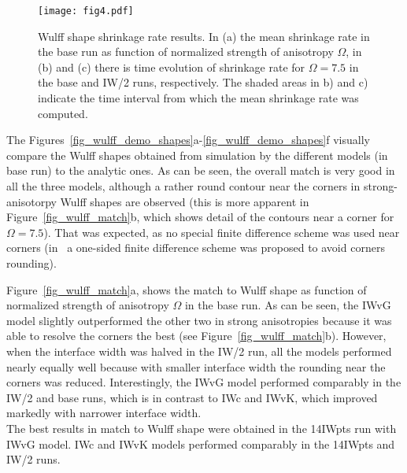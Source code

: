 \begin{figure}
	\centering
	\texttt{[image: fig4.pdf]}
	\caption[Wulff shape shrinkage rate results]{Wulff shape shrinkage rate results. In (a) the mean shrinkage rate in the base run as function of normalized strength of anisotropy $\Omega$, in (b) and (c) there is time evolution of shrinkage rate for $\Omega=7.5$ in the base and IW/2 runs, respectively. The shaded areas in b) and c) indicate the time interval from which the mean shrinkage rate was computed.}
	\label{fig_wulff_shrrate}
\end{figure}

The Figures~\ref{fig_wulff_demo_shapes}a-\ref{fig_wulff_demo_shapes}f visually compare the Wulff shapes obtained from simulation by the different models (in base run) to the analytic ones. As can be seen, the overall match is very good in all the three models, although a rather round contour near the corners in strong-anisotorpy Wulff shapes are observed (this is more apparent in Figure~\ref{fig_wulff_match}b, which shows detail of the contours near a corner for $\Omega=7.5$). That was expected, as no special finite difference scheme was used near corners (in~\cite{Eggleston2001} a one-sided finite difference scheme was proposed to avoid corners rounding). 

Figure~\ref{fig_wulff_match}a, shows the match to Wulff shape as function of normalized strength of anisotropy $\Omega$ in the base run. As can be seen, the IWvG model slightly outperformed the other two in strong anisotropies because it was able to resolve the corners the best (see Figure~\ref{fig_wulff_match}b). However, when the interface width was halved in the IW/2 run, all the models performed nearly equally well because with smaller interface width the rounding near the corners was reduced. Interestingly, the IWvG model performed comparably in the IW/2 and base runs, which is in contrast to IWc and IWvK, which improved markedly with narrower interface width. \\
The best results in match to Wulff shape were obtained in the 14IWpts run with IWvG model. IWc and IWvK models performed comparably in the 14IWpts and IW/2 runs.

